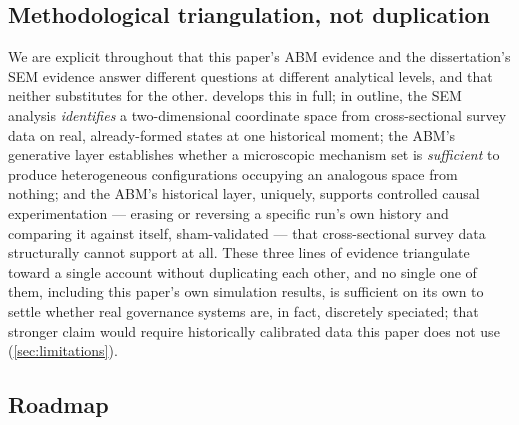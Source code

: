 \subsection{Methodological triangulation, not duplication}
\label{sec:intro-triangulation}

We are explicit throughout that this paper's ABM evidence and the
dissertation's SEM evidence answer different questions at different
analytical levels, and that neither substitutes for the other.
 develops this in full; in outline, the SEM
analysis \textit{identifies} a two-dimensional coordinate space from
cross-sectional survey data on real, already-formed states at one
historical moment; the ABM's generative layer establishes whether a
microscopic mechanism set is \textit{sufficient} to produce heterogeneous
configurations occupying an analogous space from nothing; and the ABM's
historical layer, uniquely, supports controlled causal experimentation ---
erasing or reversing a specific run's own history and comparing it against
itself, sham-validated --- that cross-sectional survey data structurally
cannot support at all. These three lines of evidence triangulate toward a
single account without duplicating each other, and no single one of them,
including this paper's own simulation results, is sufficient on its own to
settle whether real governance systems are, in fact, discretely speciated;
that stronger claim would require historically calibrated data this paper
does not use (\cref{sec:limitations}).

\subsection{Roadmap}
\label{sec:intro-roadmap}

